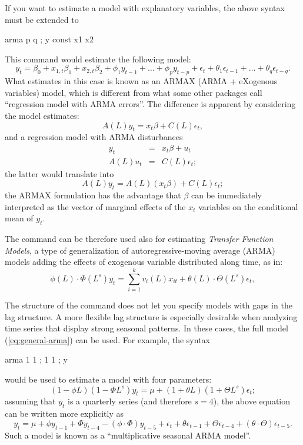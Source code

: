 If you want to estimate a model with explanatory variables, the above
syntax must be extended to
\begin{code}
  arma p q ; y const x1 x2
\end{code}
This command would estimate the following model:
\[
  y_t = \beta_0 + x_{1,t} \beta_1 + x_{2,t} \beta_2 + 
  \phi_1 y_{t-1} + \ldots + \phi_p y_{t-p} + 
  \epsilon_t + \theta_1 \epsilon_{t-1} + \ldots + \theta_q \epsilon_{t-q} .
\]
What  estimates in this case is known as an ARMAX (ARMA +
eXogenous variables) model, which is different from what some other packages
call ``regression model with ARMA errors''. The difference is apparent
by considering the model  estimates:
\begin{equation}
  \label{eq:armax}
  A(L) y_t = x_t \beta + C(L) \epsilon_t ,
\end{equation}
and a regression model with ARMA disturbances
\begin{eqnarray}
  \label{eq:reg-arma}
  y_t & = & x_t \beta + u_t \\
  A(L) u_t & = & C(L) \epsilon_t ;
\end{eqnarray}
the latter would translate into
\[
  A(L) y_t = A(L) \left(x_t \beta \right) + C(L) \epsilon_t ;
\]
the ARMAX formulation has the advantage that $\beta$ can be
immediately interpreted as the vector of marginal effects of the $x_t$
variables on the conditional mean of $y_t$.

The  command can be therefore used also for estimating \emph{Transfer Function
  Models}, a type of generalization of autoregressive-moving average
(ARMA) models adding the effects of exogenous variable distributed
along time, as in:
\begin{equation}
  \label{eq:tfunc-model}
  \phi (L) \cdot \Phi (L^s) y_t = \sum_{i=1}^kv_{i}(L)x_{it} + \theta (L)\cdot \Theta (L^s) \epsilon_t ,
\end{equation}

The structure of the  command does not let you specify
models with gaps in the lag structure. A more flexible lag
structure is especially desirable when analyzing time series that
display strong seasonal patterns. In these cases, the full model
(\ref{eq:general-arma}) can be used. For example, the syntax
\begin{code}
  arma 1 1 ; 1 1 ; y
\end{code}
would be used to estimate a model with four parameters:
\[
  ( 1 - \phi L )  ( 1 - \Phi L^s ) y_t = \mu + ( 1 + \theta L ) ( 1 + \Theta L^s ) \epsilon_t;
\]
assuming that $y_t$ is a quarterly series (and therefore $s=4$), the
above equation can be written more explicitly as
\[
  y_t = \mu + \phi y_{t-1} + \Phi y_{t-4} - (\phi \cdot \Phi) y_{t-5} + 
  \epsilon_t + \theta \epsilon_{t-1} + \Theta \epsilon_{t-4} +
  (\theta \cdot \Theta) \epsilon_{t-5} .
\]
Such a model is known as a ``multiplicative seasonal ARMA model''.

